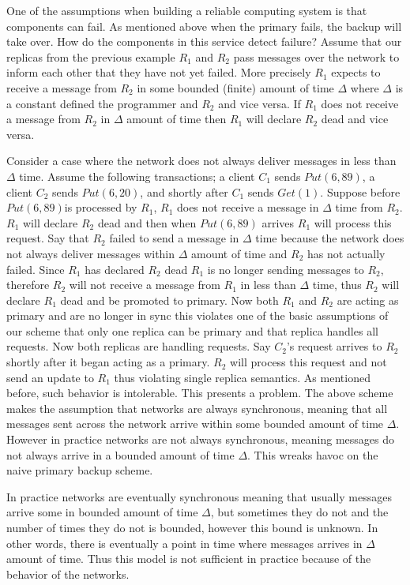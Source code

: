 \documentclass[conference]{IEEEtran}
\begin{document}
One of the assumptions when building a reliable computing system is that components can fail. As mentioned above when the primary fails, the backup will take over. How do the components in this service detect failure? Assume that our replicas from the previous example \(R_1\) and \(R_2\) pass messages over the network to inform each other that they have not yet failed. More precisely \(R_1\) expects to receive a message from \(R_2\) in some bounded (finite) amount of time $\Delta$  where $\Delta$ is a constant defined the programmer and \(R_2\) and vice versa. If \(R_1\) does not receive a message from \(R_2\) in $\Delta$ amount of time then \(R_1\) will declare \(R_2\) dead and vice versa. 

Consider a case where the network does not always deliver messages in less than $\Delta$ time. Assume the following transactions; a client \(C_1\) sends \(Put(6, 89)\), a client \(C_2\) sends \(Put(6, 20)\), and shortly after \(C_1\) sends \(Get(1)\). Suppose before \(Put(6, 89)\)is processed by \(R_1\), \(R_1\) does not receive a message in $\Delta$ time from \(R_2\). \(R_1\) will declare \(R_2\) dead and then when \(Put(6, 89)\) arrives \(R_1\) will process this request. Say that \(R_2\) failed to send a message in $\Delta$ time because the network does not always deliver messages within $\Delta$ amount of time and \(R_2\) has not actually failed. Since \(R_1\) has declared \(R_2\) dead \(R_1\) is no longer sending messages to \(R_2\), therefore \(R_2\) will not receive a message from \(R_1\) in less than $\Delta$ time, thus \(R_2\) will declare \(R_1\) dead and be promoted to primary. Now both \(R_1\) and \(R_2\) are acting as primary and are no longer in sync this violates one of the basic assumptions of our scheme that only one replica can be primary and that replica handles all requests.  Now both replicas are handling requests. Say \(C_2\)’s request arrives to \(R_2\) shortly after it began acting as a primary. \(R_2\) will process this request and not send an update to \(R_1\) thus violating single replica semantics. As mentioned before, such behavior is intolerable. This presents a problem. The above scheme makes the assumption that networks are always synchronous, meaning that all messages sent across the network arrive within some bounded amount of time $\Delta$. However in practice networks are not always synchronous, meaning messages do not always arrive in a bounded amount of time $\Delta$. This wreaks havoc on the naive primary backup scheme. 

In practice networks are eventually synchronous meaning that usually messages arrive some in bounded amount of time $\Delta$, but sometimes they do not and the number of times they do not is bounded, however this bound is unknown. In other words, there is eventually a point in time where messages arrives in $\Delta$ amount of time. Thus this model is not sufficient in practice because of the behavior of the networks. 
\end{document}
